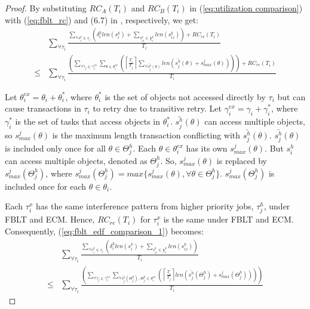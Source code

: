 \documentclass[prodmode,acmtecs]{acmsmall}
\begin{document}
\begin{proof}
By substituting $RC_{A}(T_{i})$ and $RC_{B}(T_{i})$ in (\ref{eq:utilization comparison})
with (\ref{eq:fblt_rc}) and (6.7) in \cite{shambake_phd_proposal}, 
respectively, we get: 
\begin{eqnarray}
 & \sum_{\forall\tau_{i}}\frac{\sum_{\forall s_{i}^{k}\in s_{i}}\left(\delta_{i}^{k}len(s_{i}^{k})+\sum_{s_{iz}^k\in \chi_i^k} len(s_{iz}^{k})\right)+RC_{re}(T_{i})}{T_{i}}\label{eq:fblt_edf_comparison_1}\\
\le & \sum_{\forall\tau_{i}}\frac{\left(\sum_{\forall\tau_{j}\in\gamma_{i}^{ex}}\sum_{\theta\in\theta_{i}^{ex}}\left(\left\lceil \frac{T_{i}}{T_{j}}\right\rceil \sum_{\forall\bar{s_{j}^{h}}(\theta)}len\left(\bar{s_{j}^{h}}(\theta)+s_{max}^{j}(\theta)\right)\right)\right)+RC_{re}(T_{i})}{T_{i}}\nonumber 
\end{eqnarray}


Let $\theta_{i}^{ex}=\theta_{i}+\theta_{i}^{*}$, where $\theta_{i}^{*}$
is the set of objects not accessed directly by $\tau_{i}$ but can
cause transactions in $\tau_{i}$ to retry due to transitive retry.
Let $\gamma_{i}^{ex}=\gamma_{i}+\gamma_{i}^{*}$, where $\gamma_{i}^{*}$
is the set of tasks that access objects in $\theta_{i}^{*}$. $\bar{s_{j}^{h}}(\theta)$
can access multiple objects, so $s_{max}^{j}(\theta)$ is the maximum
length transaction conflicting with $\bar{s_{j}^{h}}(\theta)$. $\bar{s_{j}^{h}}(\theta)$ is included only once for all $\theta \in \Theta_j^h$. Each $\theta \in \theta_i^{ex}$ has its own $s_{max}^j(\theta)$. But $s_i^h$ can access multiple objects, denoted as $\Theta_j^h$. So, $s_{max}^j(\theta)$ is replaced by $s_{max}^j(\Theta_j^h)$, where $s_{max}^j(\Theta_j^h)=max\{s_{max}^j(\theta),\forall \theta \in \Theta_j^h\}$.
 $s_{max}^j(\Theta_j^h)$ is included once for each $\theta \in \theta_i$. 
 
 
Each $\tau_i^x$ 
has the same interference pattern from higher priority jobs, $\tau_j^h$, under FBLT and ECM. Hence, $RC_{re}(T_i)$ for $\tau_i^x$ is the same under FBLT and ECM. Consequently, (\ref{eq:fblt_edf_comparison_1})
becomes:
\begin{eqnarray}
 & \sum_{\forall\tau_{i}}\frac{\sum_{\forall s_{i}^{k}\in s_{i}}\left(\delta_{i}^{k}len(s_{i}^{k})+\sum_{s_{iz}^k\in \chi_i^k} len(s_{iz}^{k})\right)}{T_{i}}\label{eq:fblt_edf_comparison_3}\\
\le & \sum_{\forall\tau_{i}}\frac{\left(\sum_{\forall\tau_{j}\in\gamma_{i}^{ex}}\sum_{\forall \bar{s_{j}^{h}}(\Theta_j^h),\,\Theta_j^h\in\theta_{i}^{ex}}\left(\left\lceil \frac{T_{i}}{T_{j}}\right\rceil len\left(\bar{s_{j}^{h}}(\Theta_j^h)+s_{max}^{j}(\Theta_j^h)\right)\right)\right)}{T_{i}}\nonumber 
\end{eqnarray}



\end{proof}
\end{document}
